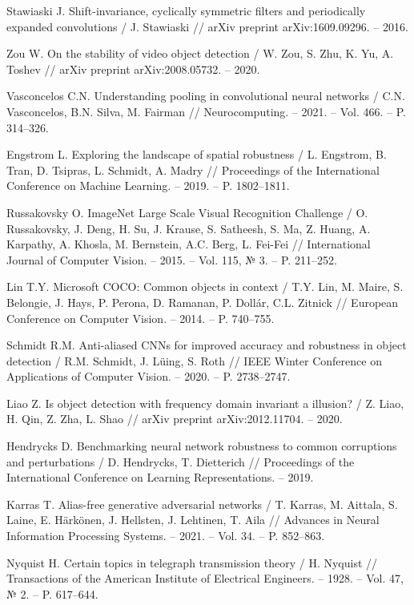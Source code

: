 \begin{thebibliography}{99}
Stawiaski J. Shift-invariance, cyclically symmetric filters and periodically expanded convolutions / J. Stawiaski // arXiv preprint arXiv:1609.09296. -- 2016.

Zou W. On the stability of video object detection / W. Zou, S. Zhu, K. Yu, A. Toshev // arXiv preprint arXiv:2008.05732. -- 2020.

Vasconcelos C.N. Understanding pooling in convolutional neural networks / C.N. Vasconcelos, B.N. Silva, M. Fairman // Neurocomputing. -- 2021. -- Vol. 466. -- P. 314--326.

Engstrom L. Exploring the landscape of spatial robustness / L. Engstrom, B. Tran, D. Tsipras, L. Schmidt, A. Madry // Proceedings of the International Conference on Machine Learning. -- 2019. -- P. 1802--1811.

Russakovsky O. ImageNet Large Scale Visual Recognition Challenge / O. Russakovsky, J. Deng, H. Su, J. Krause, S. Satheesh, S. Ma, Z. Huang, A. Karpathy, A. Khosla, M. Bernstein, A.C. Berg, L. Fei-Fei // International Journal of Computer Vision. -- 2015. -- Vol. 115, № 3. -- P. 211--252.

Lin T.Y. Microsoft COCO: Common objects in context / T.Y. Lin, M. Maire, S. Belongie, J. Hays, P. Perona, D. Ramanan, P. Dollár, C.L. Zitnick // European Conference on Computer Vision. -- 2014. -- P. 740--755.

Schmidt R.M. Anti-aliased CNNs for improved accuracy and robustness in object detection / R.M. Schmidt, J. Lüing, S. Roth // IEEE Winter Conference on Applications of Computer Vision. -- 2020. -- P. 2738--2747.

Liao Z. Is object detection with frequency domain invariant a illusion? / Z. Liao, H. Qin, Z. Zha, L. Shao // arXiv preprint arXiv:2012.11704. -- 2020.

Hendrycks D. Benchmarking neural network robustness to common corruptions and perturbations / D. Hendrycks, T. Dietterich // Proceedings of the International Conference on Learning Representations. -- 2019.

Karras T. Alias-free generative adversarial networks / T. Karras, M. Aittala, S. Laine, E. Härkönen, J. Hellsten, J. Lehtinen, T. Aila // Advances in Neural Information Processing Systems. -- 2021. -- Vol. 34. -- P. 852--863.

Nyquist H. Certain topics in telegraph transmission theory / H. Nyquist // Transactions of the American Institute of Electrical Engineers. -- 1928. -- Vol. 47, № 2. -- P. 617--644.


\end{thebibliography}
